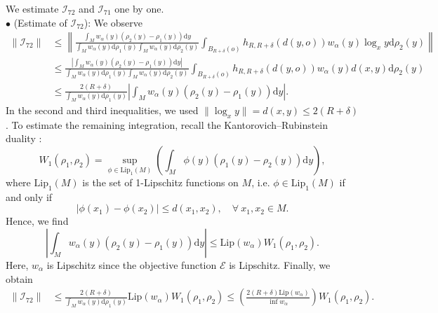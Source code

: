 \documentclass[11pt]{amsart}
\def\d{\mathrm{d}}
\newcommand{\p}{o}%
\newcommand{\dist}{d}%
\begin{document}
We estimate $\mathcal{I}_{72}$ and $\mathcal{I}_{71}$ one by one.\\

\noindent $\bullet$ (Estimate of $\mathcal I_{72}$): We observe
\begin{align*}
\|\mathcal{I}_{72}\|&\leq\left\|\frac{\int_{M}w_\alpha(y)(\rho_2(y)-\rho_1(y))\d y}{\int_{M}w_\alpha(y)\d \rho_1(y)\int_{M}w_\alpha(y)\d \rho_2(y)}\int_{B_{R+\delta}(\p)}h_{R, R+\delta}(\dist(y, \p))w_\alpha(y)\log_xy\d \rho_2(y)\right\|\\
&\leq\frac{\left|\int_{M}w_\alpha(y)(\rho_2(y)-\rho_1(y))\d y\right|}{\int_{M}w_\alpha(y)\d \rho_1(y)\int_{M}w_\alpha(y)\d \rho_2(y)}\int_{B_{R+\delta}(\p)}h_{R, R+\delta}(\dist(y, \p))w_\alpha(y)\dist(x, y)\d \rho_2(y)\\
&\leq\frac{2(R+\delta)}{\int_{M}w_\alpha(y)\d \rho_1(y)}\left|\int_{M}w_\alpha(y)(\rho_2(y)-\rho_1(y))\d y\right|.
\end{align*}
In the second and third inequalities, we used $\|\log_xy\|=\dist(x, y)\leq 2(R+\delta)$. To estimate the remaining integration, recall the Kantorovich--Rubinstein duality \cite{Villani}:
\[
W_1(\rho_1,\rho_2)=\sup_{\phi\in \mathrm{Lip}_1(M)}\left(\int_M\phi(y)(\rho_1(y)-\rho_2(y))\d y\right),
\]
where $\mathrm{Lip}_1(M)$ is the set of 1-Lipschitz functions on $M$, i.e. $\phi\in \mathrm{Lip}_1(M)$ if and only if
\[
|\phi(x_1)-\phi(x_2)|\leq \dist(x_1, x_2),\quad\forall~x_1, x_2\in M.
\]
Hence, we find
\[
\left|\int_Mw_\alpha(y)(\rho_2(y)-\rho_1(y))\d y\right|\leq \mathrm{Lip}(w_\alpha)W_1(\rho_1, \rho_2).
\]
 Here, $w_\alpha$ is Lipschitz since the objective function $\mathcal{E}$ is Lipschitz. Finally, we obtain 
\begin{align*}
\|\mathcal{I}_{72}\|&\leq \frac{2(R+\delta)}{\int_M w_\alpha(y)\d\rho_1(y)}\mathrm{Lip}(w_\alpha)W_1(\rho_1, \rho_2)
\leq \left(\frac{2(R+\delta)\mathrm{Lip}(w_\alpha)}{\inf w_\alpha}\right)W_1(\rho_1, \rho_2).
\end{align*}\\
\end{document}
